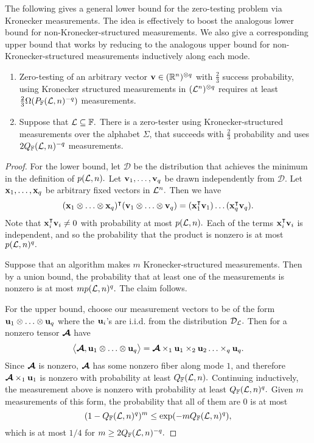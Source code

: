 The following gives a general lower bound for the zero-testing problem via Kronecker measurements.  The idea is effectively to boost the analogous lower bound for non-Kronecker-structured measurements.  We also give a corresponding upper bound that works by reducing to the analogous upper bound for non-Kronecker-structured measurements inductively along each mode.



\begin{theorem}
\label{thm:zero_testing_from_general_to_kronecker}
\begin{enumerate}[label=(\roman*)]
\item Zero-testing of an arbitrary vector $\boldsymbol{\mathrm{v}} \in (\mathbb{R}^n)^{\otimes q}$ with $\frac23$ success probability, using Kronecker structured measurements in $({\mathcal L}^n)^{\otimes q}$ requires at least $\frac23\Omega(P_{{\mathbb F}}({\mathcal L}, n)^{-q})$ measurements.

\item Suppose that ${\mathcal L} \subseteq \mathbb{F}.$ There is a zero-tester using Kronecker-structured measurements over the alphabet $\Sigma$, that succeeds with $\frac23$ probability and uses $2 Q_{\mathbb{F}}({\mathcal L}, n)^{-q}$ measurements.
\end{enumerate}

\end{theorem}
\begin{proof}
For the lower bound, let $\mathcal{D}$ be the distribution that achieves the minimum in the definition of $p({\mathcal L}, n).$  Let $\boldsymbol{\mathrm{v}}_1, \ldots, \boldsymbol{\mathrm{v}}_q$ be drawn independently from $\mathcal{D}.$  Let $\boldsymbol{\mathrm{x}}_1, \ldots, \boldsymbol{\mathrm{x}}_q$ be arbitrary fixed vectors in ${\mathcal L}^n.$  Then we have
\[
(\boldsymbol{\mathrm{x}}_1 \otimes \ldots \otimes \boldsymbol{\mathrm{x}}_q)^\intercal (\boldsymbol{\mathrm{v}}_1 \otimes \ldots \otimes \boldsymbol{\mathrm{v}}_q) 
= (\boldsymbol{\mathrm{x}}_1^\intercal \boldsymbol{\mathrm{v}}_1)\ldots (\boldsymbol{\mathrm{x}}_q^\intercal \boldsymbol{\mathrm{v}}_q).
\]
Note that $\boldsymbol{\mathrm{x}}_i^\intercal \boldsymbol{\mathrm{v}}_i \neq 0$ with probability at most $p({\mathcal L}, n).$  Each of the terms $\boldsymbol{\mathrm{x}}_i^\intercal \boldsymbol{\mathrm{v}}_i$ is independent, and so the probability that the product is nonzero is at most $p({\mathcal L}, n)^q.$

Suppose that an algorithm makes $m$ Kronecker-structured measurements.  Then by a union bound, the probability that at least one of the measurements is nonzero is at most $m p({\mathcal L}, n)^q.$  The claim follows.

For the upper bound, choose our measurement vectors to be of the form $\boldsymbol{\mathrm{u}}_1 \otimes \ldots \otimes \boldsymbol{\mathrm{u}}_q$ where the $\boldsymbol{\mathrm{u}}_i$'s are i.i.d. from the distribution $\mathcal{D}_{{\mathcal L}}.$  Then for a nonzero tensor $\boldsymbol{\mathcal{A}}$ have
\[
\left\langle \boldsymbol{\mathcal{A}}, \boldsymbol{\mathrm{u}}_1 \otimes \ldots \otimes \boldsymbol{\mathrm{u}}_q \right\rangle
= \boldsymbol{\mathcal{A}} \times_1 \boldsymbol{\mathrm{u}}_1 \times_2 \boldsymbol{\mathrm{u}}_2 \ldots \times_q \boldsymbol{\mathrm{u}}_q.
\]
Since $\boldsymbol{\mathcal{A}}$ is nonzero, $\boldsymbol{\mathcal{A}}$ has some nonzero fiber along mode $1$, and therefore $\boldsymbol{\mathcal{A}} \times_1 \boldsymbol{\mathrm{u}}_1$ is nonzero with probability at least $Q_{\mathbb{F}}({\mathcal L}, n).$  Continuing inductively, the measurement above is nonzero with probability at least $Q_{\mathbb{F}}({\mathcal L}, n)^q.$  Given $m$ measurements of this form, the probability that all of them are $0$ is at most
\[
(1 - Q_{\mathbb{F}}({\mathcal L}, n)^q)^m
\leq \exp(-m Q_{\mathbb{F}}({\mathcal L}, n)^q),
\]
which is at most $1/4$ for $m\geq 2 Q_{\mathbb{F}}({\mathcal L}, n)^{-q}.$
\end{proof}


